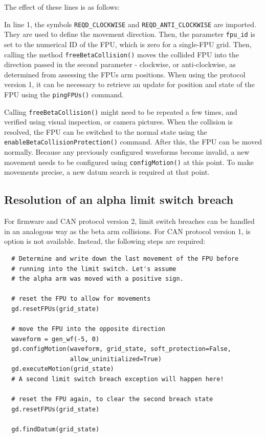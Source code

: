 \documentclass[11pt,a4paper]{report}
\begin{document}
The effect of these lines is as follows:

In line 1, the symbols \texttt{REQD\_CLOCKWISE} and
\texttt{REQD\_ANTI\_CLOCKWISE} are imported. They are used to define
the movement direction. Then, the parameter \texttt{fpu\_id} is set to
the numerical ID of the FPU, which is zero for a single-FPU
grid. Then, calling the method \texttt{freeBetaCollision()} moves the
collided FPU into the direction passed in the second parameter -
clockwise, or anti-clockwise, as determined from assessing the FPUs
arm positions. When using the protocol version 1, it can be necessary
to retrieve an update for position and state of the FPU using the
\texttt{pingFPUs()} command.

Calling \texttt{freeBetaCollision()} might need to be repeated a few
times, and verified using visual inspection, or camera pictures. When
the collision is resolved, the FPU can be switched to the normal state
using the \texttt{enableBetaCollisionProtection()} command.  After
this, the FPU can be moved normally. Because any previously configured
waveforms become invalid, a new movement needs to be configured using
\texttt{configMotion()} at this point. To make movements precise, a
new datum search is required at that point.

\subsection{Resolution of an alpha limit switch breach}
For firmware and CAN protocol  version 2, limit switch
breaches can be handled in an analogous way as the
beta arm collisions. For CAN protocol version 1,
is option is not available. Instead, the following
steps are required:

\begin{verbatim}
  # Determine and write down the last movement of the FPU before
  # running into the limit switch. Let's assume
  # the alpha arm was moved with a positive sign.

  # reset the FPU to allow for movements
  gd.resetFPUs(grid_state)

  # move the FPU into the opposite direction
  waveform = gen_wf(-5, 0)
  gd.configMotion(waveform, grid_state, soft_protection=False,
                  allow_uninitialized=True)
  gd.executeMotion(grid_state)
  # A second limit switch breach exception will happen here!

  # reset the FPU again, to clear the second breach state
  gd.resetFPUs(grid_state)

  gd.findDatum(grid_state)
  
\end{verbatim}
  
\end{document}
